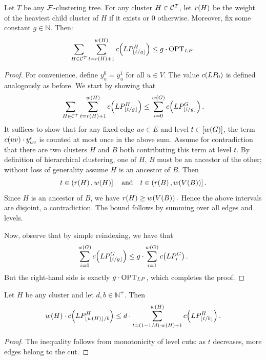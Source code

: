     \begin{lemma}\label{lem:relaxation-decomposition}
        Let $T$ be any $\mathcal{F}$-clustering tree. For any cluster $H \in \mathcal{C}^T$, let $r\mathopen{}\left( H \right)$ be the weight of the heaviest child cluster of $H$ if it exists or $0$ otherwise. Moreover, fix some constant $g\in \mathbb{N}$. Then:
        \begin{align*}
            \sum_{H\in \mathcal{C}^T}\sum_{t=r\mathopen{}\left( H \right)+1}^{w\mathopen{}\left( H \right)} c\mathopen{}\left( LP_{\mathopen{}\left\lfloor t/g \right\rfloor}^H \right)\leq g\cdot \text{OPT}_{LP}.
        \end{align*}
    \end{lemma}
    \begin{proof}
        For convenience, define $y_{u}^0=y_{u}^1$ for all $u\in V$. The value $c\mathopen{}\left( LP_{0} \right)$ is defined analogously as before.
        We start by showing that 
        \[
        \sum_{H\in \mathcal{C}^T}\sum_{t=r\mathopen{}\left( H \right)+1}^{w\mathopen{}\left( H \right)} c\mathopen{}\left( LP_{\mathopen{}\left\lfloor t/g \right\rfloor}^H \right)\leq \sum_{i=0}^{w\mathopen{}\left( G \right)} c\mathopen{}\left( LP_{\mathopen{}\left\lfloor i/g \right\rfloor}^G \right).
        \]
        It suffices to show that for any fixed edge $uv\in E$ and level $t\in [w\mathopen{}\left( G \right)]$, the term $c\mathopen{}\left( uv \right)\cdot y_{uv}^t$ is counted at most once in the above sum. Assume for contradiction that there are two clusters $H$ and $B$ both contributing this term at level $t$. By definition of hierarchical clustering, one of $H$, $B$ must be an ancestor of the other; without loss of generality assume $H$ is an ancestor of $B$. Then
        \[
            t \in \left(r\mathopen{}\left( H \right), w\mathopen{}\left( H \right)\right]\quad \text{and} \quad
            t \in \left(r\mathopen{}\left( B \right), w\mathopen{}\left( V\mathopen{}\left( B \right) \right)\right].
        \]
        Since $H$ is an ancestor of $B$, we have $r\mathopen{}\left( H \right) \geq w\mathopen{}\left( V\mathopen{}\left( B \right) \right).$
        Hence the above intervals are disjoint, a contradiction. The bound follows by summing over all edges and levels.

        Now, observe that by simple reindexing, we have that 
        \[\sum_{i=0}^{w\mathopen{}\left( G \right)} c\mathopen{}\left( LP_{\mathopen{}\left\lfloor i/g \right\rfloor}^G \right)\leq g\cdot\sum_{i=1}^{w\mathopen{}\left( G \right)} c\mathopen{}\left( LP_{i}^G \right).\]
        But the right-hand side is exactly $g\cdot \text{OPT}_{LP}$, which completes the proof.
    \end{proof}

    \begin{lemma}\label{lem:lp-level-bound}
        Let $H$ be any cluster and let $d, b\in\mathbb{N}^+$. Then
        \[
        w\mathopen{}\left( H \right)\cdot c\mathopen{}\left( LP_{\mathopen{}\left\lfloor w\mathopen{}\left( H \right) \right\rfloor/b}^H \right)\leq d\cdot \sum_{t=\mathopen{}\left( 1-1/d \right)\cdot w\mathopen{}\left( H \right)+1}^{w\mathopen{}\left( H \right)} c\mathopen{}\left( LP_{\mathopen{}\left\lfloor t/b \right\rfloor}^H \right).
        \]
    \end{lemma}
    \begin{proof}
    The inequality follows from monotonicity of level cuts: as $t$ decreases, more edges belong to the cut.
    \end{proof}

